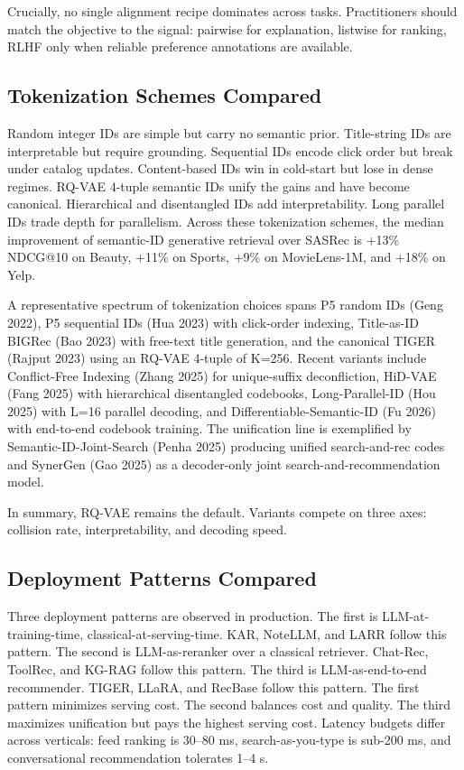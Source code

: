 Crucially, no single alignment recipe dominates across tasks. Practitioners should match the objective to the signal: pairwise for explanation, listwise for ranking, RLHF only when reliable preference annotations are available.

\subsection{Tokenization Schemes Compared}\label{tokenization-schemes-compared}

Random integer IDs are simple but carry no semantic prior. Title-string IDs are interpretable but require grounding. Sequential IDs encode click order but break under catalog updates. Content-based IDs win in cold-start but lose in dense regimes. RQ-VAE 4-tuple semantic IDs unify the gains and have become canonical. Hierarchical and disentangled IDs add interpretability. Long parallel IDs trade depth for parallelism. Across these tokenization schemes, the median improvement of semantic-ID generative retrieval over SASRec is +13\% NDCG@10 on Beauty, +11\% on Sports, +9\% on MovieLens-1M, and +18\% on Yelp.

A representative spectrum of tokenization choices spans P5 random IDs (Geng 2022), P5 sequential IDs (Hua 2023) with click-order indexing, Title-as-ID BIGRec (Bao 2023) with free-text title generation, and the canonical TIGER (Rajput 2023) using an RQ-VAE 4-tuple of K=256. Recent variants include Conflict-Free Indexing (Zhang 2025) for unique-suffix deconfliction, HiD-VAE (Fang 2025) with hierarchical disentangled codebooks, Long-Parallel-ID (Hou 2025) with L=16 parallel decoding, and Differentiable-Semantic-ID (Fu 2026) with end-to-end codebook training. The unification line is exemplified by Semantic-ID-Joint-Search (Penha 2025) producing unified search-and-rec codes and SynerGen (Gao 2025) as a decoder-only joint search-and-recommendation model.

In summary, RQ-VAE remains the default. Variants compete on three axes: collision rate, interpretability, and decoding speed.

\subsection{Deployment Patterns Compared}\label{deployment-patterns-compared}

Three deployment patterns are observed in production. The first is LLM-at-training-time, classical-at-serving-time. KAR, NoteLLM, and LARR follow this pattern. The second is LLM-as-reranker over a classical retriever. Chat-Rec, ToolRec, and KG-RAG follow this pattern. The third is LLM-as-end-to-end recommender. TIGER, LLaRA, and RecBase follow this pattern. The first pattern minimizes serving cost. The second balances cost and quality. The third maximizes unification but pays the highest serving cost. Latency budgets differ across verticals: feed ranking is 30--80 ms, search-as-you-type is sub-200 ms, and conversational recommendation tolerates 1--4 s.

